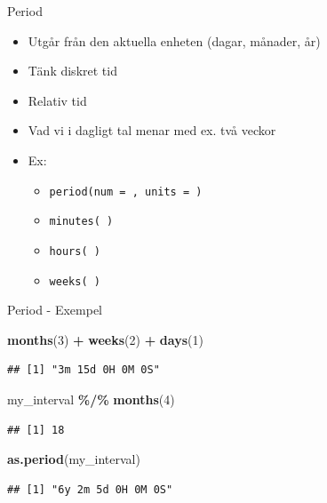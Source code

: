 \documentclass[
  11pt,
  ignorenonframetext,
  handout]{beamer}
\newenvironment{Shaded}{\begin{snugshade}}{\end{snugshade}}
\newcommand{\DecValTok}[1]{\textcolor[rgb]{0.00,0.00,0.81}{#1}}
\newcommand{\FunctionTok}[1]{\textcolor[rgb]{0.13,0.29,0.53}{\textbf{#1}}}
\newcommand{\NormalTok}[1]{#1}
\newcommand{\SpecialCharTok}[1]{\textcolor[rgb]{0.81,0.36,0.00}{\textbf{#1}}}
\providecommand{\tightlist}{%
  \setlength{\itemsep}{0pt}\setlength{\parskip}{0pt}}
\begin{document}
\begin{frame}{Period}
\protect{}\label{period}
\begin{itemize}
\tightlist
\item
  Utgår från den aktuella enheten (dagar, månader, år)
\item
  Tänk diskret tid
\item
  Relativ tid
\item
  Vad vi i dagligt tal menar med ex. två veckor
\item
  Ex:

  \begin{itemize}
  \tightlist
  \item
    \texttt{period(num = , units = )}
  \item
    \texttt{minutes( )}
  \item
    \texttt{hours( )}
  \item
    \texttt{weeks( )}
  \end{itemize}
\end{itemize}
\end{frame}

\begin{frame}[fragile]{Period - Exempel}
\protect{}\label{period---exempel}
\begin{Shaded}
\begin{Highlighting}[]
\FunctionTok{months}\NormalTok{(}\DecValTok{3}\NormalTok{) }\SpecialCharTok{+} \FunctionTok{weeks}\NormalTok{(}\DecValTok{2}\NormalTok{) }\SpecialCharTok{+} \FunctionTok{days}\NormalTok{(}\DecValTok{1}\NormalTok{)}
\end{Highlighting}
\end{Shaded}

\begin{verbatim}
## [1] "3m 15d 0H 0M 0S"
\end{verbatim}

\begin{Shaded}
\begin{Highlighting}[]
\NormalTok{my\_interval }\SpecialCharTok{\%/\%} \FunctionTok{months}\NormalTok{(}\DecValTok{4}\NormalTok{)}
\end{Highlighting}
\end{Shaded}

\begin{verbatim}
## [1] 18
\end{verbatim}

\begin{Shaded}
\begin{Highlighting}[]
\FunctionTok{as.period}\NormalTok{(my\_interval)}
\end{Highlighting}
\end{Shaded}

\begin{verbatim}
## [1] "6y 2m 5d 0H 0M 0S"
\end{verbatim}
\end{frame}
\end{document}
